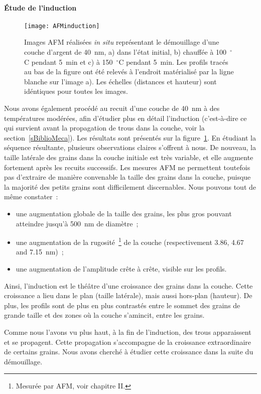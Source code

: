 \paragraph*{Étude de l'induction}
\begin{figure}[h]
	\centering
	\texttt{[image: AFMinduction]}
	\caption{Images AFM réalisées \textit{in situ} représentant le démouillage d'une couche d'argent de 40~nm, a) dans l'état initial, b) chauffée à 100~$^\circ$C pendant 5~min et c) à 150~$^\circ$C pendant 5~min. Les profils tracés au bas de la figure ont été relevés à l'endroit matérialisé par la ligne blanche sur l'image a). Les échelles (distances et hauteur) sont idéntiques pour toutes les images.}
	\label{AFMinduction}
\end{figure}

Nous avons également procédé au recuit d'une couche de 40~nm à des températures modérées, afin d'étudier plus en détail l'induction (c'est-à-dire ce qui survient avant la propagation de trous dans la couche, voir la section~\ref{sBiblioMeca}). Les résultats sont présentés sur la figure~\ref{AFMinduction}. En étudiant la séquence résultante, plusieurs observations claires s'offrent à nous. De nouveau, la taille latérale des grains dans la couche initiale est très variable, et elle augmente fortement après les recuits successifs. Les mesures AFM ne permettent toutefois pas d'extraire de manière convenable la taille des grains dans la couche, puisque la majorité des petits grains sont difficilement discernables. Nous pouvons tout de même constater~:
\begin{itemize}
\item une augmentation globale de la taille des grains, les plus gros pouvant atteindre jusqu'à 500~nm de diamètre~;
\item une augmentation de la rugosité~\footnote{Mesurée par AFM, voir chapitre II.} de la couche (respectivement 3.86, 4.67 and 7.15~nm)~;
\item une augmentation de l'amplitude crête à crête, visible sur les profils.
\end{itemize}
Ainsi, l'induction est le théâtre d'une croissance des grains dans la couche. Cette croissance a lieu dans le plan (taille latérale), mais aussi hors-plan (hauteur). De plus, les profils sont de plus en plus contrastés entre le sommet des grains de grande taille et des zones où la couche s'amincit, entre les grains.\par
Comme nous l'avons vu plus haut, à la fin de l'induction, des trous apparaissent et se propagent. Cette propagation s'accompagne de la croissance extraordinaire de certains grains. Nous avons cherché à étudier cette croissance dans la suite du démouillage.\par 

